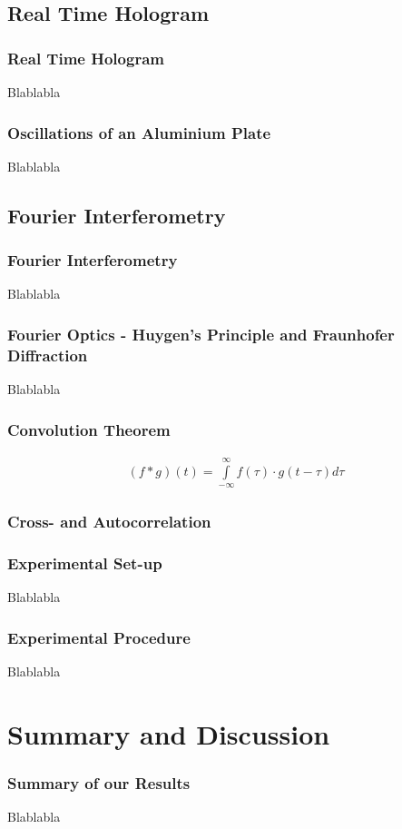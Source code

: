 \documentclass{beamer}
\begin{document}
\subsection{Real Time Hologram}
\frame{\tableofcontents[currentsubsection]}
\begin{frame}
	\frametitle{Real Time Hologram}
	Blablabla
\end{frame}
\begin{frame}
	\frametitle{Oscillations of an Aluminium Plate}
	Blablabla
\end{frame}
\subsection{Fourier Interferometry}
\frame{\tableofcontents[currentsubsection]}
\begin{frame}
	\frametitle{Fourier Interferometry}
	Blablabla
\end{frame}
\begin{frame}
	\frametitle{Fourier Optics - Huygen's Principle and Fraunhofer Diffraction}
	Blablabla
\end{frame}
\begin{frame}
	\frametitle{Convolution Theorem}
	\begin{align}
	(f*g)(t)=\int\limits_{-\infty}^{\infty} f(\tau)\cdot g(t-\tau) d\tau \label{Convo1}
	\end{align}
\end{frame}
\begin{frame}
	\frametitle{Cross- and Autocorrelation}
\end{frame}
\begin{frame}
	\frametitle{Experimental Set-up}
	Blablabla
\end{frame}
\begin{frame}
	\frametitle{Experimental Procedure}
	Blablabla
\end{frame}
\section{Summary and Discussion}
\frame{\tableofcontents[currentsection]}
\begin{frame}
	\frametitle{Summary of our Results}
	Blablabla
\end{frame}
\end{document}
